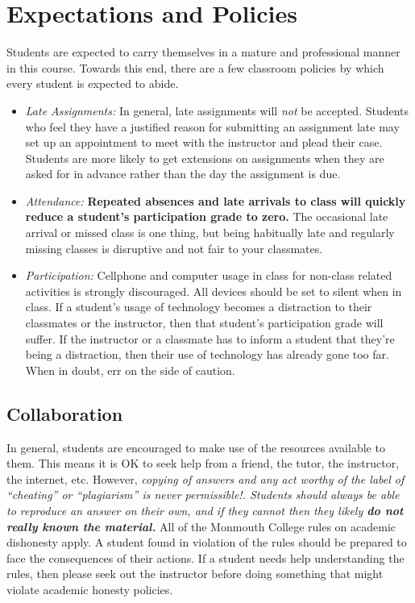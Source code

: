 \documentclass[10pt]{article}
\begin{document}
\section{Expectations and Policies}

Students are expected to carry themselves in a mature and professional manner in this course. Towards this end, there are a few classroom policies by which every student is expected to abide.
\begin{itemize}

\item \textit{Late Assignments: } In general, late assignments will \textit{not} be accepted.  Students who feel they have a justified reason for submitting an assignment late may set up an appointment to meet with the instructor and plead their case.  Students are more likely to get extensions on assignments when they are asked for in advance rather than the day the assignment is due.

\item \textit{Attendance: } \textbf{Repeated absences and late arrivals to class will quickly reduce a student's participation grade to zero.}  The occasional late arrival or missed class is one thing, but being habitually late and regularly missing classes is disruptive and not fair to your classmates.

\item \textit{Participation: }  Cellphone and computer usage in class for non-class related activities is strongly discouraged.  All devices should be set to silent when in class.  If a student's usage of technology becomes a distraction to their classmates or the instructor, then that student's participation grade will suffer.  If the instructor or a classmate has to inform a student that they're being a distraction, then their use of technology has already gone too far.  When in doubt, err on the side of caution.

\end{itemize}


\subsection{Collaboration}

In general, students are encouraged to make use of the resources available to them.  This means it is OK to seek help from a friend, the tutor, the instructor, the internet, etc.  However, \textit{copying of answers and any act worthy of the label of ``cheating'' or ``plagiarism'' is never permissible!. Students should always be able to reproduce an answer on their own, and if they cannot then they likely \textbf{do not really known the material.}} All of the Monmouth College rules on academic dishonesty apply.  A student found in violation of the rules should be prepared to face the consequences of their actions. If a student needs help understanding the rules, then please seek out the instructor before doing something that might violate academic honesty policies.
\end{document}
